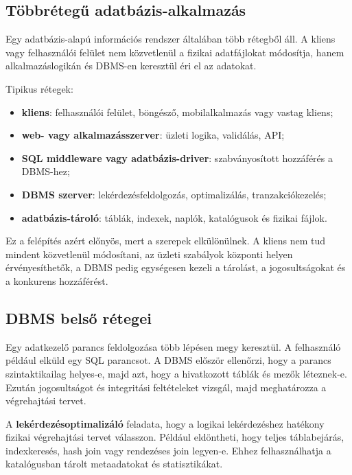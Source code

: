 \subsection{Többrétegű adatbázis-alkalmazás}

Egy adatbázis-alapú információs rendszer általában több rétegből áll. A kliens vagy felhasználói felület nem közvetlenül a fizikai adatfájlokat módosítja, hanem alkalmazáslogikán és DBMS-en keresztül éri el az adatokat.

Tipikus rétegek:

\begin{itemize}
  \item \textbf{kliens}: felhasználói felület, böngésző, mobilalkalmazás vagy vastag kliens;
  \item \textbf{web- vagy alkalmazásszerver}: üzleti logika, validálás, API;
  \item \textbf{SQL middleware vagy adatbázis-driver}: szabványosított hozzáférés a DBMS-hez;
  \item \textbf{DBMS szerver}: lekérdezésfeldolgozás, optimalizálás, tranzakciókezelés;
  \item \textbf{adatbázis-tároló}: táblák, indexek, naplók, katalógusok és fizikai fájlok.
\end{itemize}

Ez a felépítés azért előnyös, mert a szerepek elkülönülnek. A kliens nem tud mindent közvetlenül módosítani, az üzleti szabályok központi helyen érvényesíthetők, a DBMS pedig egységesen kezeli a tárolást, a jogosultságokat és a konkurens hozzáférést.

\subsection{DBMS belső rétegei}

Egy adatkezelő parancs feldolgozása több lépésen megy keresztül. A felhasználó például elküld egy SQL parancsot. A DBMS először ellenőrzi, hogy a parancs szintaktikailag helyes-e, majd azt, hogy a hivatkozott táblák és mezők léteznek-e. Ezután jogosultságot és integritási feltételeket vizsgál, majd meghatározza a végrehajtási tervet.



A \textbf{lekérdezésoptimalizáló} feladata, hogy a logikai lekérdezéshez hatékony fizikai végrehajtási tervet válasszon. Például eldöntheti, hogy teljes táblabejárás, indexkeresés, hash join vagy rendezéses join legyen-e. Ehhez felhasználhatja a katalógusban tárolt metaadatokat és statisztikákat.

